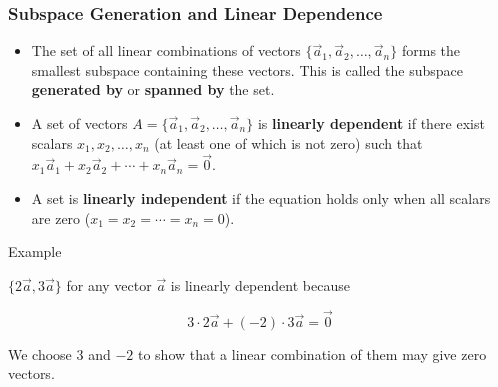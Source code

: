 \documentclass[aspectratio=169,xcolor=dvipsnames,svgnames,x11names,fleqn]{beamer}
\begin{document}
\begin{frame}[allowframebreaks]
\frametitle{Subspace Generation and Linear Dependence}
\begin{itemize}
    \item The set of all linear combinations of vectors $\{\vec{a}_1, \vec{a}_2, \dots, \vec{a}_n\}$ forms the smallest subspace containing these vectors. This is called the subspace \textbf{generated by} or \textbf{spanned by} the set.
    \item A set of vectors $A=\{\vec{a}_1, \vec{a}_2, \dots, \vec{a}_n\}$ is \textbf{linearly dependent} if there exist scalars $x_1, x_2, \dots, x_n$ (at least one of which is not zero) such that $x_{1}\vec{a}_{1}+x_{2}\vec{a}_{2}+\cdots+x_{n}\vec{a}_{n}=\vec{0}$.
    \item A set is \textbf{linearly independent} if the equation holds only when all scalars are zero ($x_1=x_2=\cdots=x_n=0$).
\end{itemize}
\end{frame}

\begin{frame}{Example}

    $\{2\vec{a}, 3\vec{a}\}$ for any vector $\vec{a}$ is linearly dependent because 

    $$
    3\cdot 2 \vec{a} + (-2)\cdot 3 \vec{a} = \vec{0}
    $$

    We choose $3$ and $-2$ to show that a linear combination of them may give zero vectors.
    
\end{frame}
\end{document}
